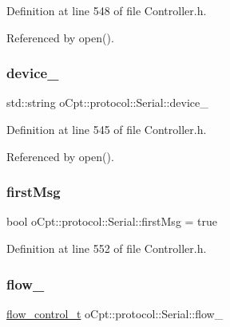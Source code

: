Definition at line 548 of file Controller.\+h.



Referenced by open().

\hypertarget{classo_cpt_1_1protocol_1_1_serial_aef59f7008f19eb073071a836b923c47e}{}\label{classo_cpt_1_1protocol_1_1_serial_aef59f7008f19eb073071a836b923c47e} 
\subsubsection{\texorpdfstring{device\+\_\+}{device\_}}
{\footnotesize\ttfamily std\+::string o\+Cpt\+::protocol\+::\+Serial\+::device\+\_\+\hspace{0.3cm}{\ttfamily [protected]}}



Definition at line 545 of file Controller.\+h.



Referenced by open().

\hypertarget{classo_cpt_1_1protocol_1_1_serial_affbe5790cd34027fa6b65dbb98f5d5bc}{}\label{classo_cpt_1_1protocol_1_1_serial_affbe5790cd34027fa6b65dbb98f5d5bc} 
\subsubsection{\texorpdfstring{first\+Msg}{firstMsg}}
{\footnotesize\ttfamily bool o\+Cpt\+::protocol\+::\+Serial\+::first\+Msg = true\hspace{0.3cm}{\ttfamily [protected]}}



Definition at line 552 of file Controller.\+h.

\hypertarget{classo_cpt_1_1protocol_1_1_serial_a08eb8b737e453a84f6db746c79c0fab1}{}\label{classo_cpt_1_1protocol_1_1_serial_a08eb8b737e453a84f6db746c79c0fab1} 
\subsubsection{\texorpdfstring{flow\+\_\+}{flow\_}}
{\footnotesize\ttfamily \hyperlink{classo_cpt_1_1protocol_1_1_serial_ad32f1d64fb16a5443d7aae92e8b14232}{flow\+\_\+control\+\_\+t} o\+Cpt\+::protocol\+::\+Serial\+::flow\+\_\+\hspace{0.3cm}{\ttfamily [protected]}}




